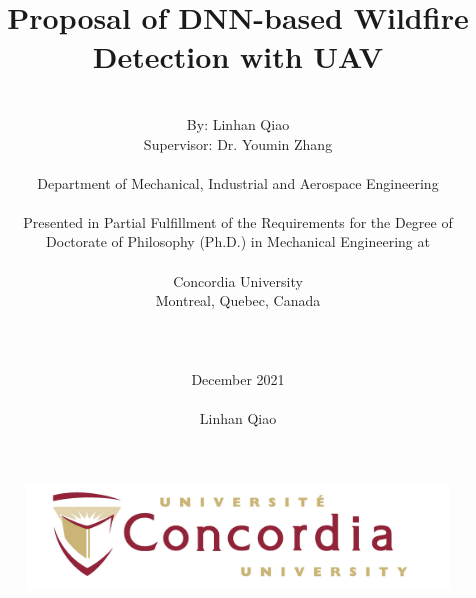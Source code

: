 
\begin{figure}
	\centering
	\includegraphics[width=4.5in]{./figs/Title.jpg}
\end{figure}
\title{\bf Proposal of DNN-based Wildfire Detection with UAV}
\author{\\ \normalsize  By:  Linhan Qiao \\
	\normalsize Supervisor:  Dr. Youmin Zhang \\ \\  
	\small Department of Mechanical, Industrial and Aerospace Engineering\\ \\ 
	\small Presented in Partial Fulfillment of the Requirements for the Degree of\\ 
	\small Doctorate of Philosophy (Ph.D.) in Mechanical Engineering at\\ \\ 
	\small Concordia University\\ 
	\small Montreal, Quebec, Canada\\ \\ \\ \\ 
	\small December 2021
	\small \date{} \\ 
	\small \textcopyright Linhan Qiao\\}

\maketitle
\newpage

